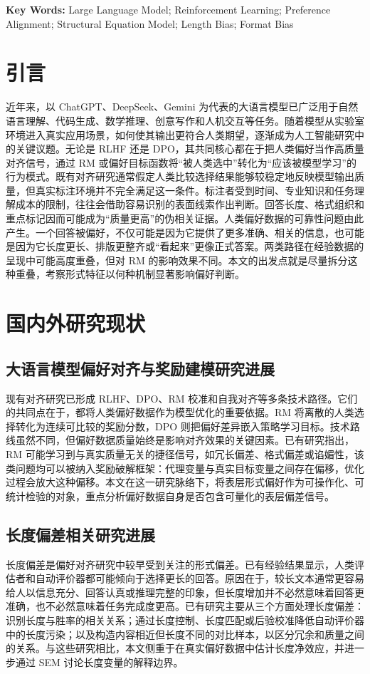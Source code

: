 \documentclass[9pt,a4paper,fontset=windows]{ctexart}
\theoremstyle{definition}
\numberwithin{equation}{section}
\begin{document}
\noindent\textbf{Key Words:} Large Language Model; Reinforcement Learning; Preference Alignment; Structural Equation Model; Length Bias; Format Bias

\vspace{1em}

\section{引言}

近年来，以 ChatGPT、DeepSeek、Gemini 为代表的大语言模型已广泛用于自然语言理解、代码生成、数学推理、创意写作和人机交互等任务。随着模型从实验室环境进入真实应用场景，如何使其输出更符合人类期望，逐渐成为人工智能研究中的关键议题。无论是 RLHF 还是 DPO，其共同核心都在于把人类偏好当作高质量对齐信号，通过 RM 或偏好目标函数将“被人类选中”转化为“应该被模型学习”的行为模式。既有对齐研究通常假定人类比较选择结果能够较稳定地反映模型输出质量，但真实标注环境并不完全满足这一条件。标注者受到时间、专业知识和任务理解成本的限制，往往会借助容易识别的表面线索作出判断。回答长度、格式组织和重点标记因而可能成为“质量更高”的伪相关证据。人类偏好数据的可靠性问题由此产生。一个回答被偏好，不仅可能是因为它提供了更多准确、相关的信息，也可能是因为它长度更长、排版更整齐或“看起来”更像正式答案。两类路径在经验数据的呈现中可能高度重叠，但对 RM 的影响效果不同。本文的出发点就是尽量拆分这种重叠，考察形式特征以何种机制显著影响偏好判断。

\section{国内外研究现状}

\subsection{大语言模型偏好对齐与奖励建模研究进展}
现有对齐研究已形成 RLHF、DPO、RM 校准和自我对齐等多条技术路径。它们的共同点在于，都将人类偏好数据作为模型优化的重要依据。RM 将离散的人类选择转化为连续可比较的奖励分数，DPO 则把偏好差异嵌入策略学习目标。技术路线虽然不同，但偏好数据质量始终是影响对齐效果的关键因素。已有研究指出，RM 可能学习到与真实质量无关的捷径信号，如冗长偏差、格式偏差或谄媚性，该类问题均可以被纳入奖励破解框架：代理变量与真实目标变量之间存在偏移，优化过程会放大这种偏移。本文在这一研究脉络下，将表层形式偏好作为可操作化、可统计检验的对象，重点分析偏好数据自身是否包含可量化的表层偏差信号。

\subsection{长度偏差相关研究进展}
长度偏差是偏好对齐研究中较早受到关注的形式偏差。已有经验结果显示，人类评估者和自动评价器都可能倾向于选择更长的回答。原因在于，较长文本通常更容易给人以信息充分、回答认真或推理完整的印象，但长度增加并不必然意味着回答更准确，也不必然意味着任务完成度更高。已有研究主要从三个方面处理长度偏差：识别长度与胜率的相关关系；通过长度控制、长度匹配或后验校准降低自动评价器中的长度污染；以及构造内容相近但长度不同的对比样本，以区分冗余和质量之间的关系。与这些研究相比，本文侧重于在真实偏好数据中估计长度净效应，并进一步通过 SEM 讨论长度变量的解释边界。
\end{document}
